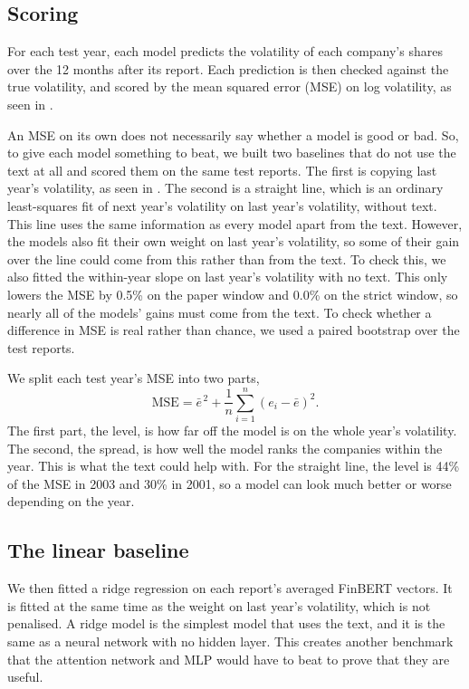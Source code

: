\documentclass[11pt,a4paper]{article}
\begin{document}
\subsection{Scoring}\label{sec:methods-scoring}

For each test year, each model predicts the volatility of each company's shares over the 12 months after its report. Each prediction is then checked against the true volatility, and scored by the mean squared error (MSE) on log volatility, as seen in \citet{kogan2009}.

An MSE on its own does not necessarily say whether a model is good or bad. So, to give each model something to beat, we built two baselines that do not use the text at all and scored them on the same test reports. The first is copying last year's volatility, as seen in \citet{kogan2009}. The second is a straight line, which is an ordinary least-squares fit of next year's volatility on last year's volatility, without text. This line uses the same information as every model apart from the text. However, the models also fit their own weight on last year's volatility, so some of their gain over the line could come from this rather than from the text. To check this, we also fitted the within-year slope on last year's volatility with no text. This only lowers the MSE by 0.5\% on the paper window and 0.0\% on the strict window, so nearly all of the models' gains must come from the text. To check whether a difference in MSE is real rather than chance, we used a paired bootstrap over the test reports.

We split each test year's MSE into two parts,
\[
  \text{MSE} = \bar e^{\,2} + \frac{1}{n}\sum_{i=1}^{n} (e_i - \bar e)^2 .
\]
The first part, the level, is how far off the model is on the whole year's volatility. The second, the spread, is how well the model ranks the companies within the year. This is what the text could help with. For the straight line, the level is 44\% of the MSE in 2003 and 30\% in 2001, so a model can look much better or worse depending on the year.

\subsection{The linear baseline}\label{sec:methods-ridge}

We then fitted a ridge regression on each report's averaged FinBERT vectors. It is fitted at the same time as the weight on last year's volatility, which is not penalised. A ridge model is the simplest model that uses the text, and it is the same as a neural network with no hidden layer. This creates another benchmark that the attention network and MLP would have to beat to prove that they are useful.
\end{document}
